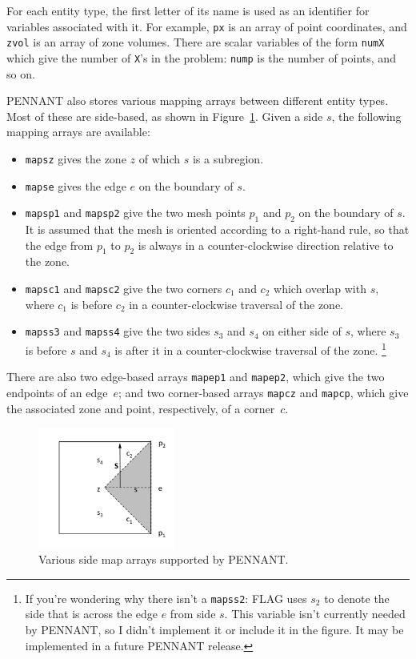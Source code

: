 \documentclass[11pt,letterpaper]{article} %
\begin{document}
For each entity type, the first letter of its name is used as an
identifier for variables associated with it.  For example, {\tt px}
is an array of point coordinates, and {\tt zvol} is an array
of zone volumes.  There are scalar variables of the form
{\tt numX} which give the number of {\tt X}'s in the problem:
{\tt nump} is the number of points, and so on.

PENNANT also stores various mapping arrays between different entity
types.  Most of these are side-based, as shown in Figure~\ref{fig:side}.
Given a side $s$, the following mapping arrays are available:
\begin{itemize}
\item {\tt mapsz} gives the zone $z$ of which $s$ is a subregion.
\item {\tt mapse} gives the edge $e$ on the boundary of $s$.
\item {\tt mapsp1} and {\tt mapsp2} give the two mesh points $p_1$ and
$p_2$ on the boundary of $s$.  It is assumed that the mesh is oriented
according to a right-hand rule, so that the edge from $p_1$ to $p_2$
is always in a counter-clockwise direction relative to the zone.
\item {\tt mapsc1} and {\tt mapsc2} give the two corners $c_1$ and
$c_2$ which overlap with $s$, where $c_1$ is before $c_2$ in
a counter-clockwise traversal of the zone.
\item {\tt mapss3} and {\tt mapss4} give the two sides $s_3$ and
$s_4$ on either side of $s$, where $s_3$ is before $s$ and $s_4$ is
after it in a counter-clockwise traversal of the zone.
\footnote{If you're wondering why there isn't a {\tt mapss2}:
FLAG uses $s_2$ to denote the side that is across the edge $e$ from
side $s$.  This variable isn't currently needed by PENNANT, so I didn't
implement it or include it in the figure.  It may be implemented in
a future PENNANT release.}
\end{itemize}
There are also two edge-based arrays {\tt mapep1} and {\tt mapep2},
which give the two endpoints of an edge~$e$; and two corner-based
arrays {\tt mapcz} and {\tt mapcp}, which give the associated zone
and point, respectively, of a corner~$c$.

\begin{figure}
    \centering
    \includegraphics[width=0.40\textwidth]{side-maps.png}
    \caption{Various side map arrays supported by PENNANT.}
    \label{fig:side}
\end{figure}
\end{document}
